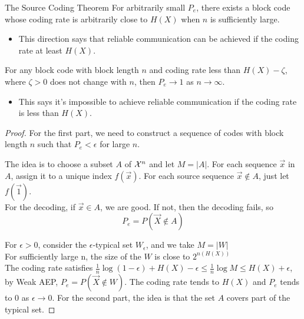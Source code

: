 \documentclass[../main.tex]{subfiles}
\begin{document}
\begin{bbox}{The Source Coding Theorem}
    For arbitrarily small $P_e$, there exists a block code whose coding rate is arbitrarily close to $H(X)$ when $n$ is sufficiently large.
    \begin{itemize}
        \item This direction says that reliable communication can be achieved if the coding rate at least $H(X)$.
    \end{itemize}
    For any block code with block length $n$ and coding rate less than $H(X)-\zeta$, where $\zeta >0$ does not change with $n$, then $P_e\to 1$ as $n\to \infty$.
    \begin{itemize}
        \item This says it's impossible to achieve reliable communication if the coding rate is less than $H(X)$.
    \end{itemize}
    \begin{proof}
    
        For the first part, we need to construct a sequence of codes with block length $n$ such that $P_e < \epsilon$ for large $n$. \\

        \begin{remark}
            The idea is to choose a subset $A$ of $\mathcal{X}^n$ and let $M=|A|$. For each sequence $\vec x$ in $A$, assign it to a unique index $f(\vec x)$. For each source sequence $\vec x\notin A$, just let $f(\vec 1)$.\\
            For the decoding, if $\vec x \in A$, we are good. If not, then the decoding fails, so \[
            P_e = P(\vec X\notin A)
            \] 
        \end{remark}
        For $\epsilon > 0$, consider the $\epsilon$-typical set $W_\epsilon$, and we take $M=|W|$\\
        For sufficiently large n, the size of the $W$ is close to $2^{n(H(X))}$\\
        The coding rate satisfies $\frac{1}{n}\log(1-\epsilon) + H(X)-\epsilon \leq \frac{1}{n}\log M \leq H(X)+\epsilon$,
        by Weak AEP, $P_e = P(\vec X\notin W)$. The coding rate tends to $H(X)$ and $P_e$ tends to $0$ as $\epsilon \to 0$.
        \newline
        For the second part, the idea is that the set $A$ covers part of the typical set.
    \end{proof}
\end{bbox}
\end{document}
